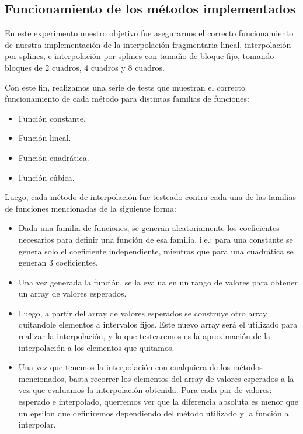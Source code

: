 \subsection{Funcionamiento de los métodos implementados}
En este experimento nuestro objetivo fue asegurarnos el correcto funcionamiento de nuestra implementación de la interpolación fragmentaria lineal, interpolación por splines, e interpolación por splines con tamaño de bloque fijo, tomando bloques de 2 cuadros, 4 cuadros y 8 cuadros.

Con este fin, realizamos una serie de tests que muestran el correcto funcionamiento de cada método para distintas familias de funciones:
\begin{itemize}
  \item Función constante.
  \item Función lineal.
  \item Función cuadrática.
  \item Función cúbica.
\end{itemize}

Luego, cada método de interpolación fue testeado contra cada una de las familias de funciones mencionadas de la siguiente forma:
\begin{itemize}
  \item Dada una familia de funciones, se generan aleatoriamente los coeficientes necesarios para definir una función de esa familia, i.e.: para una constante se genera solo el coeficiente independiente, mientras que para una cuadrática se generan 3 coeficientes.
    \item Una vez generada la función, se la evalua en un rango de valores para obtener un array de valores esperados.
    \item Luego, a partir del array de valores esperados se construye otro array quitandole elementos a intervalos fijos.
        Este nuevo array será el utilizado para realizar la interpolación, y lo que testearemos es la aproximación de  la
        interpolación a los elementos que quitamos.
    \item Una vez que tenemos la interpolación con cualquiera de los métodos mencionados, basta recorrer los elementos del array de valores esperados a la vez que evaluamos la interpolación obtenida.
        Para cada par de valores: esperado e interpolado, querremos ver que la diferencia absoluta es menor que un epsilon que
        definiremos dependiendo del método utilizado y la función a interpolar.
\end{itemize}

